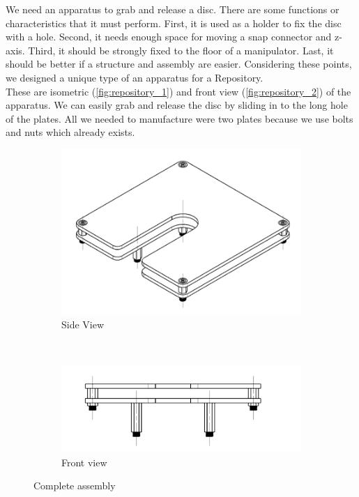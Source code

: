 \documentclass[a4paper,12pt]{scrreprt}
\begin{document}
We need an apparatus to grab and release a disc. There are some functions or characteristics that it must perform. First, it is used as a holder to fix the disc with a hole. Second, it needs enough space for moving a snap connector and z-axis. Third, it should be strongly fixed to the floor of a manipulator. Last, it should be better if a structure and assembly are easier. Considering these points, we designed a unique type of an apparatus for a \acs{Repository}.\\
These are isometric (\autoref{fig:repository_1}) and front view (\autoref{fig:repository_2}) of the apparatus. We can easily grab and release the disc by sliding in to the long hole of the plates. All we needed to manufacture were two plates because we use bolts and nuts which already exists.
  \begin{figure}[H]
        \centering
        \begin{subfigure}[b]{0.45\textwidth}
                \centering
                \includegraphics[width=1\textwidth]{pictures/repository_1}
                \caption{Side View}\label{fig:repository_1}
        \end{subfigure}%
        ~ %
        \begin{subfigure}[b]{0.45\textwidth}
                \centering
                \includegraphics[width=1\textwidth]{pictures/repository_2}
                \caption{Front view}\label{fig:repository_2}
        \end{subfigure}
        \caption[Complete assembly]{Complete assembly}\label{fig:repository_1_2}
  \end{figure}
\end{document}
